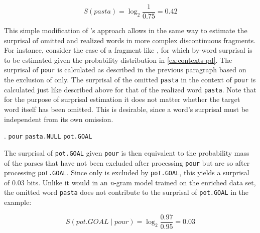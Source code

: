 \begin{equation}
S(pasta) = \log_2 \frac{1}{0.75} = 0.42 \label{eq:pasta-s}
\end{equation}

This simple modification of \citeauthor{hale2001}'s approach allows in the same way to estimate the surprisal of omitted and realized words in more complex discontinuous fragments. For instance, consider the case of a fragment like \Next, for which by-word surprisal is to be estimated given the probability distribution in \ref{ex:contexts-pd}. The surprisal of \texttt{pour} is calculated as described in the previous paragraph based on the exclusion of \LLast[c] only. The surprisal of the omitted \texttt{pasta} in the context of \texttt{pour} is calculated just like described above for that of the realized word \texttt{pasta}. Note that for the purpose of surprisal estimation it does not matter whether the target word itself has been omitted. This is desirable, since a word's surprisal must be independent from its own omission.

\ex. \texttt{pour} \texttt{pasta.NULL} \texttt{pot.GOAL}

The surprisal of \texttt{pot.GOAL} given \texttt{pour} is then equivalent to the probability mass of the parses that have not been excluded after processing \texttt{pour} but are so after processing \texttt{pot.GOAL}. Since only \Last[d] is excluded by \texttt{pot.GOAL}, this yields a surprisal of 0.03 bits. Unlike it would in an \textit{n}-gram model trained on the enriched data set, the omitted word \texttt{pasta} does not contribute to the surprisal of \texttt{pot.GOAL} in the example:

\begin{equation}
S(pot.GOAL\mathbin{|}pour) = \log_2 \frac{0.97}{0.95} = 0.03
\end{equation}

